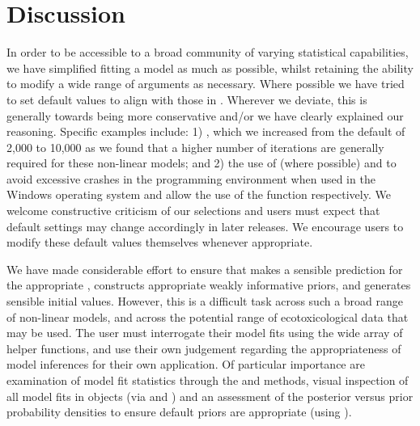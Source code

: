 \documentclass[
  shortnames]{jss}
\begin{document}
\hypertarget{discussion}{%
\section{Discussion}\label{discussion}}

In order to be accessible to a broad community of varying statistical capabilities, we have simplified fitting a  model as much as possible, whilst retaining the ability to modify a wide range of arguments as necessary. Where possible we have tried to set default values to align with those in . Wherever we deviate, this is generally towards being more conservative and/or we have clearly explained our reasoning. Specific examples include: 1) , which we increased from the  default of 2,000 to 10,000 as we found that a higher number of iterations are generally required for these non-linear models; and 2) the use of  (where possible) and  to avoid excessive crashes in the  programming environment when used in the Windows operating system and allow the use of the  function respectively. We welcome constructive criticism of our selections and users must expect that default settings may change accordingly in later releases. We encourage users to modify these default values themselves whenever appropriate.

We have made considerable effort to ensure that  makes a sensible prediction for the appropriate , constructs appropriate weakly informative priors, and generates sensible initial values. However, this is a difficult task across such a broad range of non-linear models, and across the potential range of ecotoxicological data that may be used. The user must interrogate their model fits using the wide array of helper functions, and use their own judgement regarding the appropriateness of model inferences for their own application. Of particular importance are examination of model fit statistics through the  and  methods, visual inspection of all model fits in  objects (via  and ) and an assessment of the posterior versus prior probability densities to ensure default priors are appropriate (using ).
\end{document}

